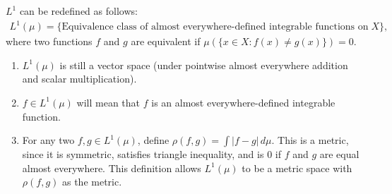 \documentclass[a4paper,english,12pt]{article}
\begin{document}
\begin{defn}$L^1$ can be redefined as follows:
\begin{align*}
L^1(\mu)=\{\text{Equivalence class of almost everywhere-defined integrable functions on}\; X\},
\end{align*}
where two functions $f$ and $g$ are equivalent if $\mu(\{x\in X:f(x)\neq g(x)\})=0$.
\end{defn}

\begin{rem}
\begin{enumerate}[\itshape(i)]
\item $L^1(\mu)$ is still a vector space (under pointwise almost everywhere addition and scalar multiplication).
\item $f\in L^1(\mu)$ will mean that $f$ is an almost everywhere-defined integrable function.
\item For any two $f,g\in L^1(\mu)$, define $\rho(f,g)=\int |f-g|\,d\mu$. This is a metric, since it is symmetric, satisfies triangle inequality, and is $0$ if $f$ and $g$ are equal almost everywhere. This definition allows $L^1(\mu)$ to be a metric space with $\rho(f,g)$ as the metric.
\end{enumerate}
\end{rem}
\end{document}
